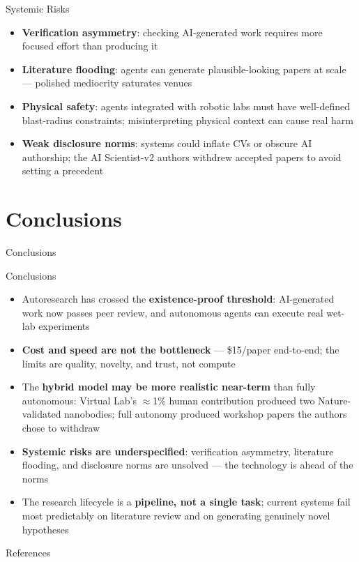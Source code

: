 \documentclass[aspectratio=169]{beamer}
\begin{document}
\begin{frame}{Systemic Risks}
  \begin{itemize}
    \item \textbf{Verification asymmetry}: checking AI-generated work requires more focused effort than producing it \citep{feng2026visionary}
    \item \textbf{Literature flooding}: agents can generate plausible-looking papers at scale --- polished mediocrity saturates venues \citep{feng2026visionary}
    \item \textbf{Physical safety}: agents integrated with robotic labs must have well-defined blast-radius constraints; misinterpreting physical context can cause real harm \citep{schmidgall2025agenticscience}
    \item \textbf{Weak disclosure norms}: systems could inflate CVs or obscure AI authorship; the AI Scientist-v2 authors withdrew accepted papers to avoid setting a precedent \citep{yamada2025aiscientistv2}
  \end{itemize}
\end{frame}

\section{Conclusions}

\begin{frame}{}
  \centering
  \Large Conclusions
\end{frame}

\begin{frame}{Conclusions}
  \begin{itemize}
    \item Autoresearch has crossed the \textbf{existence-proof threshold}: AI-generated work
          now passes peer review, and autonomous agents can execute real wet-lab experiments
    \item \textbf{Cost and speed are not the bottleneck} --- \$15/paper end-to-end;
          the limits are quality, novelty, and trust, not compute
    \item The \textbf{hybrid model may be more realistic near-term} than fully autonomous:
          Virtual Lab's $\approx$1\% human contribution produced two Nature-validated nanobodies;
          full autonomy produced workshop papers the authors chose to withdraw
    \item \textbf{Systemic risks are underspecified}: verification asymmetry, literature
          flooding, and disclosure norms are unsolved --- the technology is ahead of the norms
    \item The research lifecycle is a \textbf{pipeline, not a single task}; current systems
          fail most predictably on literature review and on generating genuinely novel hypotheses
  \end{itemize}
\end{frame}

\begin{frame}[allowframebreaks]{References}
  \footnotesize
  
  
\end{frame}
\end{document}
